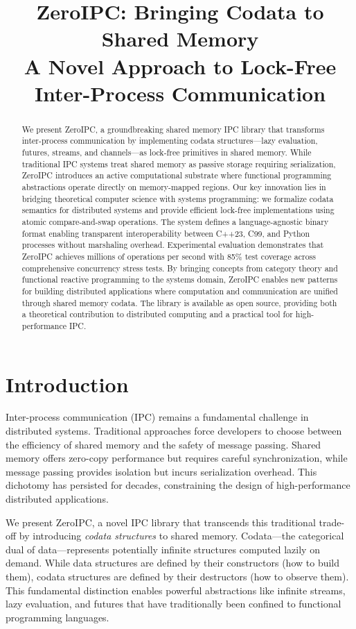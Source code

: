\documentclass[10pt,conference]{IEEEtran}
\title{ZeroIPC: Bringing Codata to Shared Memory\\
\large A Novel Approach to Lock-Free Inter-Process Communication}
\author{
\IEEEauthorblockN{Anonymous Authors}
\IEEEauthorblockA{Submission for Review}
}
\begin{document}
\maketitle

\begin{abstract}
We present ZeroIPC, a groundbreaking shared memory IPC library that transforms inter-process communication by implementing codata structures---lazy evaluation, futures, streams, and channels---as lock-free primitives in shared memory. While traditional IPC systems treat shared memory as passive storage requiring serialization, ZeroIPC introduces an active computational substrate where functional programming abstractions operate directly on memory-mapped regions. Our key innovation lies in bridging theoretical computer science with systems programming: we formalize codata semantics for distributed systems and provide efficient lock-free implementations using atomic compare-and-swap operations. The system defines a language-agnostic binary format enabling transparent interoperability between C++23, C99, and Python processes without marshaling overhead. Experimental evaluation demonstrates that ZeroIPC achieves millions of operations per second with 85\% test coverage across comprehensive concurrency stress tests. By bringing concepts from category theory and functional reactive programming to the systems domain, ZeroIPC enables new patterns for building distributed applications where computation and communication are unified through shared memory codata. The library is available as open source, providing both a theoretical contribution to distributed computing and a practical tool for high-performance IPC.
\end{abstract}

\section{Introduction}

Inter-process communication (IPC) remains a fundamental challenge in distributed systems. Traditional approaches force developers to choose between the efficiency of shared memory and the safety of message passing. Shared memory offers zero-copy performance but requires careful synchronization, while message passing provides isolation but incurs serialization overhead. This dichotomy has persisted for decades, constraining the design of high-performance distributed applications.

We present ZeroIPC, a novel IPC library that transcends this traditional trade-off by introducing \emph{codata structures} to shared memory. Codata---the categorical dual of data---represents potentially infinite structures computed lazily on demand. While data structures are defined by their constructors (how to build them), codata structures are defined by their destructors (how to observe them). This fundamental distinction enables powerful abstractions like infinite streams, lazy evaluation, and futures that have traditionally been confined to functional programming languages.
\end{document}

